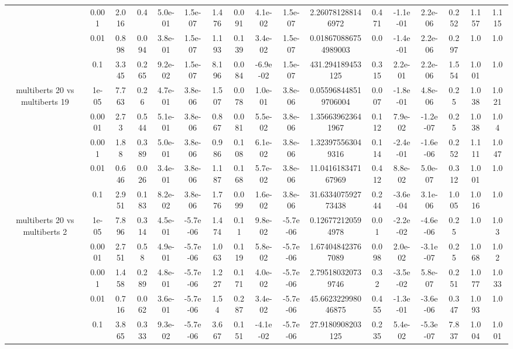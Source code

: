 \begin{tabular}{|c|c|c|c|c|c|c|c|c|c|c|c|c|c|c|c|c|}
 & 0.001 & 2.016 & 0.4 & 5.0e-01 & 1.5e-07 & 1.476 & 0.091 & 4.1e-02 & 1.5e-07 & 2.260781288146972 & 0.471 & -1.1e-01 & 2.2e-06 & 0.252 & 1.157 & 1.115 \\
 & 0.01 & 0.898 & 0.094 & 3.8e-01 & 1.5e-07 & 1.193 & 0.139 & 3.4e-02 & 1.5e-07 & 0.018670886754989003 & 0.0 & -1.4e-01 & 2.2e-06 & 0.297 & 1.0 & 1.0 \\
 & 0.1 & 3.345 & 0.265 & 9.2e-02 & 1.5e-07 & 8.196 & 0.084 & -6.9e-02 & 1.5e-07 & 431.294189453125 & 0.315 & 2.2e-01 & 2.2e-06 & 1.554 & 1.001 & 1.0 \\
\hline
\multirow{5}{*}{multiberts 20 vs multiberts 19} & 1e-05 & 7.763 & 0.26 & 4.7e-01 & 3.8e-06 & 1.507 & 0.078 & 1.0e-01 & 3.8e-06 & 0.055968448519706004 & 0.007 & -1.8e-01 & 4.8e-06 & 0.25 & 1.038 & 1.021 \\
 & 0.0001 & 2.73 & 0.544 & 5.1e-01 & 3.8e-06 & 0.867 & 0.081 & 5.5e-02 & 3.8e-06 & 1.356639623641967 & 0.112 & 7.9e-02 & -1.2e-07 & 0.25 & 1.038 & 1.04 \\
 & 0.001 & 1.88 & 0.389 & 5.0e-01 & 3.8e-06 & 0.986 & 0.108 & 6.1e-02 & 3.8e-06 & 1.323975563049316 & 0.114 & -2.4e-01 & -1.6e-06 & 0.252 & 1.111 & 1.047 \\
 & 0.01 & 0.646 & 0.026 & 3.4e-01 & 3.8e-06 & 1.187 & 0.168 & 5.7e-02 & 3.8e-06 & 11.041618347167969 & 0.412 & 8.8e-02 & 5.0e-07 & 0.312 & 1.001 & 1.0 \\
 & 0.1 & 2.951 & 0.183 & 8.2e-02 & 3.8e-06 & 1.776 & 0.099 & 1.6e-02 & 3.8e-06 & 31.633407592773438 & 0.244 & -3.6e-04 & 3.1e-06 & 1.005 & 1.016 & 1.0 \\
\hline
\multirow{5}{*}{multiberts 20 vs multiberts 2} & 1e-05 & 7.896 & 0.314 & 4.5e-01 & -5.7e-06 & 1.474 & 0.11 & 9.8e-02 & -5.7e-06 & 0.126772120594978 & 0.01 & -2.2e-02 & -4.6e-06 & 0.25 & 1.0 & 1.03 \\
 & 0.0001 & 2.751 & 0.58 & 4.9e-01 & -5.7e-06 & 1.063 & 0.119 & 5.8e-02 & -5.7e-06 & 1.674048423767089 & 0.098 & 2.0e-02 & -3.1e-07 & 0.25 & 1.068 & 1.02 \\
 & 0.001 & 1.458 & 0.289 & 4.8e-01 & -5.7e-06 & 1.227 & 0.171 & 4.0e-02 & -5.7e-06 & 2.795180320739746 & 0.32 & -3.5e-02 & 5.8e-07 & 0.251 & 1.077 & 1.033 \\
 & 0.01 & 0.716 & 0.062 & 3.6e-01 & -5.7e-06 & 1.54 & 0.287 & 3.4e-02 & -5.7e-06 & 45.662322998046875 & 0.455 & -1.3e-01 & -3.6e-06 & 0.347 & 1.093 & 1.0 \\
 & 0.1 & 3.865 & 0.333 & 9.3e-02 & -5.7e-06 & 3.667 & 0.151 & -4.1e-02 & -5.7e-06 & 27.9180908203125 & 0.235 & 5.4e-02 & -5.3e-07 & 7.837 & 1.004 & 1.001 \\

\end{tabular}
